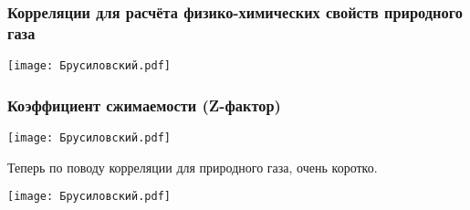\documentclass[main.tex]{subfiles}
\begin{document}
\subsubsection{Корреляции для расчёта физико-химических свойств природного газа}

\begin{center}
\texttt{[image: Брусиловский.pdf]}
\end{center}



\subsubsection{Коэффициент сжимаемости (Z-фактор)}

\begin{center}
\texttt{[image: Брусиловский.pdf]}
\end{center}

Теперь по поводу корреляции для природного газа, очень коротко.

\begin{center}
\texttt{[image: Брусиловский.pdf]}
\end{center}
\end{document}

